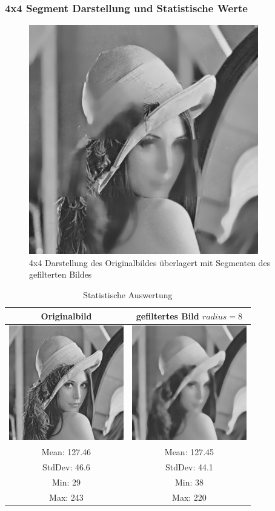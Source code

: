 \documentclass[12pt,german]{article}
\begin{document}
\subsubsection{4x4 Segment Darstellung und Statistische Werte}
\begin{figure}[H]
\centering
	\includegraphics[width=10cm]{../testData/Median/4x4LenaR8.jpg}
	\caption{4x4 Darstellung des Originalbildes überlagert mit Segmenten des gefilterten Bildes}
    \label{tab:checkerboard}
\end{figure}
\begin{table}[H]
  \centering
  \begin{tabular}{| c | c |}
    \hline
 	 Originalbild & gefiltertes Bild $radius = 8$ \\
    \hline
	\includegraphics[width=5cm]{../testData/Lena.jpg} & 	\includegraphics[width=5cm]{../testData/Median/LenaMedianR8.jpg} \\
	\hline
	Mean: 127.46 & Mean: 127.45 \\
	StdDev: 46.6 & StdDev: 44.1 \\
	Min: 29      & Min: 38      \\
	Max: 243     & Max: 220     \\
	\hline
  \end{tabular}
  \caption{Statistische Auswertung}
  \label{tab:Statistics}
\end{table}
\end{document}
